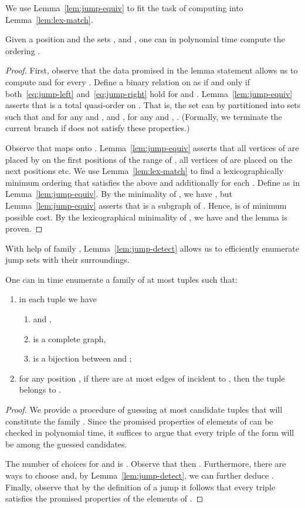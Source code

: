 We use Lemma~\ref{lem:jump-equiv} to fit the task of computing  into Lemma~\ref{lem:lex-match}.
\begin{lemma}\label{lem:jump-detect}
Given a position  and the sets ,  and
, one can
in polynomial time compute the ordering .
\end{lemma}
\begin{proof}
First, observe that the data promised in the lemma statement allows
us to compute  and 
for every .
Define a binary relation  on  as  if and only if
both~\eqref{eq:jump-left} and~\eqref{eq:jump-right} hold for  and .
Lemma~\ref{lem:jump-equiv} asserts that  is a total quasi-order on .
That is, the set  can by partitioned into sets 
such that  and  for any  and
, and ,  for any 
and , .
(Formally, we terminate the current branch if  does not satisfy these properties.)

Observe that  maps  onto .
Lemma~\ref{lem:jump-equiv} asserts that all vertices of 
are placed by  on the first  positions of the range of ,
all vertices of  are placed on the next  positions etc.
We use Lemma~\ref{lem:lex-match} to find a lexicographically minimum ordering  that satisfies the above
and additionally  for each .
Define  as in Lemma~\ref{lem:jump-equiv}.
By the minimality of , we have , but Lemma~\ref{lem:jump-equiv}
asserts that  is a subgraph of .
Hence,  is of minimum possible cost.
By the lexicographical minimality of , we have 
and the lemma is proven.
\end{proof}



With help of family , Lemma~\ref{lem:jump-detect} allows us to efficiently enumerate
jump sets with their surroundings.
\begin{theorem}\label{thm:jump-enum}
One can in  time enumerate a family 
of at most  tuples  such that:
\begin{enumerate}
\item in each tuple  we have
\begin{enumerate}
\item  and ,
\item  is a complete graph,
\item  is a bijection between  and ;
\end{enumerate}
\item for any position , if there are at most 
edges of  incident to , then
the tuple  belongs to .
\end{enumerate}
\end{theorem}
\begin{proof}
We provide a procedure of guessing at most  candidate tuples that will constitute the family . Since the promised properties of elements of  can be checked in polynomial time, it suffices to argue that every triple of the form  will be among the guessed candidates.

The number of choices for  and  is .
Observe that then .
Furthermore, there are  ways to choose 
and, by Lemma~\ref{lem:jump-detect}, we can further deduce . Finally,  observe that  by the definition of a jump it follows that every triple  satisfies the promised properties of the elements of .
\end{proof}

